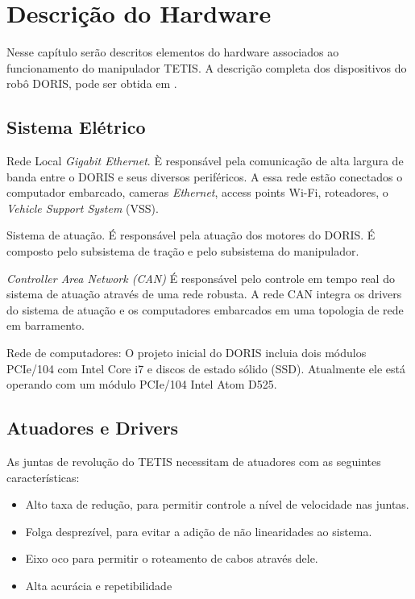 \chapter{Descrição do Hardware}

Nesse capítulo serão descritos elementos do hardware associados ao funcionamento do manipulador TETIS. A descrição completa dos dispositivos do robô DORIS, pode ser obtida em \cite{xaud2016doris}.

\section{Sistema Elétrico}

Rede Local \textit{Gigabit Ethernet}. È responsável pela comunicação de alta largura de banda entre o DORIS e seus diversos periféricos. A essa rede estão conectados o computador embarcado, cameras \textit{Ethernet}, access points Wi-Fi, roteadores, o \textit{Vehicle Support System} (VSS).

Sistema de atuação. É responsável pela atuação dos motores do DORIS. É composto pelo subsistema de tração e pelo subsistema do manipulador. 

\textit{Controller Area Network (CAN)} É responsável pelo controle em tempo real do sistema de atuação através de uma rede robusta. A rede CAN integra os drivers do sistema de atuação e os computadores embarcados em uma topologia de rede em barramento. 

Rede de computadores: O projeto inicial do DORIS incluia dois módulos PCIe/104 com Intel \texttrademark Core i7 e discos de estado sólido (SSD). Atualmente ele está operando com um módulo PCIe/104 Intel Atom D525. 


\section{Atuadores e Drivers}

As juntas de revolução do TETIS necessitam de atuadores com as seguintes características:

\begin{itemize}
\item Alto taxa de redução, para permitir controle a nível de velocidade nas juntas.
\item Folga desprezível, para evitar a adição de não linearidades ao sistema. 
\item Eixo oco para permitir o roteamento de cabos através dele.
\item Alta acurácia e repetibilidade
\end{itemize}

